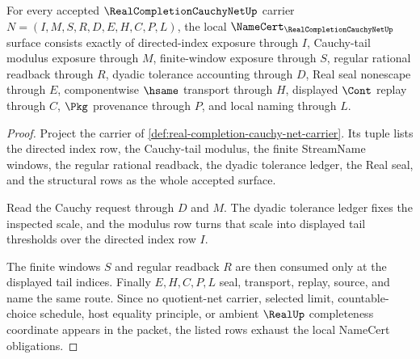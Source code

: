 \begin{theorem}
\label{thm:real-completion-cauchy-net-namecert-obligations}
For every accepted $\RealCompletionCauchyNetUp$ carrier $N=(I,M,S,R,D,E,H,C,P,L)$, the local $\NameCert_{\RealCompletionCauchyNetUp}$ surface consists exactly of directed-index exposure through $I$, Cauchy-tail modulus exposure through $M$, finite-window exposure through $S$, regular rational readback through $R$, dyadic tolerance accounting through $D$, Real seal nonescape through $E$, componentwise $\hsame$ transport through $H$, displayed $\Cont$ replay through $C$, $\Pkg$ provenance through $P$, and local naming through $L$.
\end{theorem}
\begin{proof}
Project the carrier of \autoref{def:real-completion-cauchy-net-carrier}. Its tuple lists the directed index row, the Cauchy-tail modulus, the finite StreamName windows, the regular rational readback, the dyadic tolerance ledger, the Real seal, and the structural rows as the whole accepted surface.

Read the Cauchy request through $D$ and $M$. The dyadic tolerance ledger fixes the inspected scale, and the modulus row turns that scale into displayed tail thresholds over the directed index row $I$.

The finite windows $S$ and regular readback $R$ are then consumed only at the displayed tail indices. Finally $E,H,C,P,L$ seal, transport, replay, source, and name the same route. Since no quotient-net carrier, selected limit, countable-choice schedule, host equality principle, or ambient $\RealUp$ completeness coordinate appears in the packet, the listed rows exhaust the local NameCert obligations.
\end{proof}

